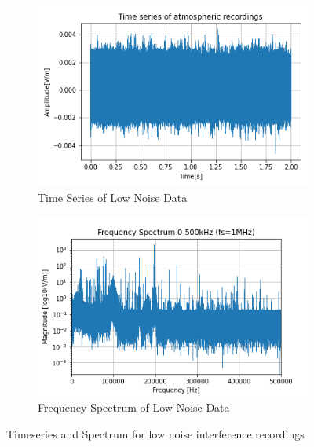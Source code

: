\begin{figure}[h!]
    \begin{subfigure}[b]{0.5\textwidth}
    \includegraphics[width = \textwidth]{figs/sig_character/Charmy/timeseriesCharmy.png}
    \caption{Time Series of Low Noise Data}
    \label{fig:charmytime}
    \end{subfigure}
    \begin{subfigure}[b]{0.5\textwidth}
    \includegraphics[width = \textwidth]{figs/sig_character/Charmy/fft_data_Charmy.png}
    \caption{Frequency Spectrum of Low Noise Data}
    \label{fig:charmySpect}
    \end{subfigure}
    \caption{Timeseries and Spectrum for low noise interference recordings}
\end{figure}


